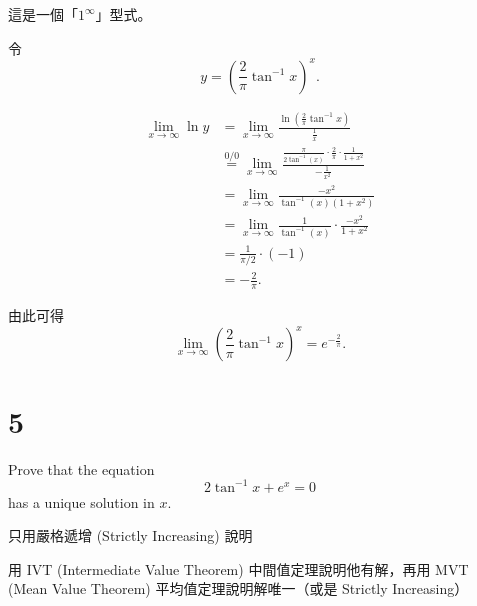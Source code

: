 \documentclass{article}
\begin{document}
\begin{reason}
	這是一個「$1^\infty$」型式。

令
\[
y = \left( \frac{2}{\pi} \tan^{-1} x \right)^x .
\]

\begin{align*}
\lim_{x \to \infty} \ln y
&= \lim_{x \to \infty} 
\frac{\ln\left( \frac{2}{\pi} \tan^{-1} x \right)}{\frac{1}{x}} \\[1ex]
&\overset{0/0}{=}
\lim_{x \to \infty}
\frac{\frac{\pi}{2 \tan^{-1}(x)} \cdot \frac{2}{\pi} \cdot \frac{1}{1+x^2}}{-\frac{1}{x^2}} \\[1ex]
&= \lim_{x \to \infty}
\frac{-x^2}{\tan^{-1}(x)(1+x^2)} \\[1ex]
&= \lim_{x \to \infty}
\frac{1}{\tan^{-1}(x)} \cdot \frac{-x^2}{1+x^2} \\[1ex]
&= \frac{1}{\pi/2} \cdot (-1) \\[1ex]
&= -\frac{2}{\pi}.
\end{align*}

由此可得
\[
\lim_{x \to \infty} \left( \frac{2}{\pi} \tan^{-1} x \right)^x
= e^{-\frac{2}{\pi}} .
\]

\end{reason}

\newpage

\section{5}

\begin{problem}
Prove that the equation $$2\tan^{-1} x + e^x = 0$$ has a unique solution in $x$.
\end{problem}
\vspace{-12pt}
\begin{wrong}
	只用嚴格遞增 (Strictly Increasing) 說明
\end{wrong}
\vspace{-12pt}
\begin{cor}
	用 IVT (Intermediate Value Theorem) 中間值定理說明他有解，再用 MVT (Mean Value Theorem) 平均值定理說明解唯一（或是 Strictly Increasing）
\end{cor}
\end{document}
